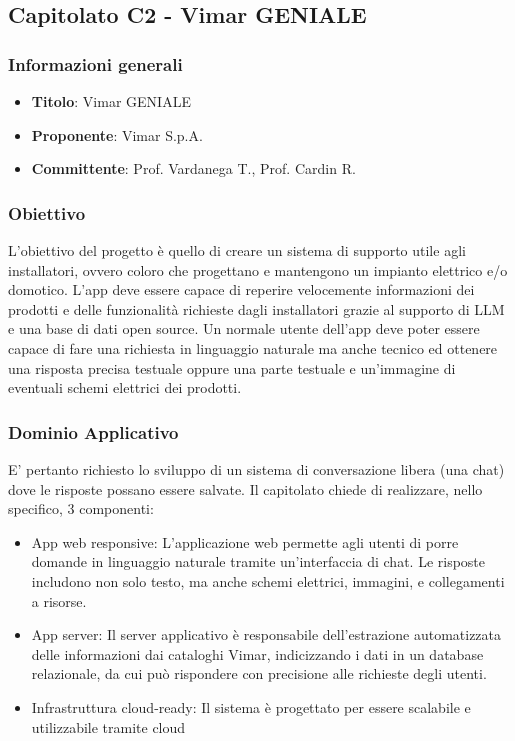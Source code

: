 \subsection{Capitolato C2 - Vimar GENIALE}
     \subsubsection{Informazioni generali}
        \begin{itemize}
            \item \textbf{Titolo}: Vimar GENIALE
            \item \textbf{Proponente}: Vimar S.p.A.
            \item \textbf{Committente}: Prof. Vardanega T., Prof. Cardin R.
        \end{itemize}
     \subsubsection{Obiettivo}
    L’obiettivo del progetto è quello di creare un sistema di supporto utile agli installatori, ovvero coloro che progettano e mantengono un impianto elettrico e/o domotico. L’app deve essere capace di reperire velocemente informazioni dei prodotti e delle funzionalità richieste dagli installatori grazie al supporto di LLM e una base di dati open source. Un normale utente dell’app deve poter essere capace di fare una richiesta in linguaggio naturale ma anche tecnico ed ottenere una risposta precisa testuale oppure una parte testuale e un’immagine di eventuali schemi elettrici dei prodotti.

     \subsubsection{Dominio Applicativo}
E’ pertanto richiesto lo sviluppo di un sistema di conversazione libera (una chat) dove le risposte possano essere salvate. Il capitolato chiede di realizzare, nello specifico, 3 componenti:
\begin{itemize}
    \item App web responsive: L'applicazione web permette agli utenti di porre domande in linguaggio naturale tramite un’interfaccia di chat. Le risposte includono non solo testo, ma anche schemi elettrici, immagini, e collegamenti a risorse.
    \item App server:  Il server applicativo è responsabile dell’estrazione automatizzata delle informazioni dai cataloghi Vimar, indicizzando i dati in un database relazionale, da cui può rispondere con precisione alle richieste degli utenti.
    \item Infrastruttura cloud-ready: Il sistema è progettato per essere scalabile e utilizzabile tramite cloud
\end{itemize}    
